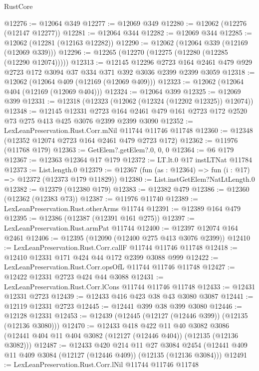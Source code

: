 \begin{lexlean}{RustCore}
\begin{coremodule}
@12276 := @12064 @349
@12277 := @12069 @349
@12280 := @12062 (@12276 (@12147 @12277))
@12281 := @12064 @344
@12282 := @12069 @344
@12285 := @12062 (@12281 (@12163 @12282))
@12290 := @12062 (@12064 @339 (@12169 (@12069 @339)))
@12296 := @12265 (@12270 (@12275 (@12280 (@12285 (@12290 @12074)))))
@12313 := @12145
    @12296
    @2723
    @164
    @2461
    @479
    @929
    @2723
    @172
    @3094
    @37
    @334
    @371
    @392
    @3036
    @2399
    @2399
    @3059
@12318 := @12062 (@12064 @409 (@12169 (@12069 @409)))
@12323 := @12062 (@12064 @404 (@12169 (@12069 @404)))
@12324 := @12064 @399
@12325 := @12069 @399
@12331 := @12318 (@12323 (@12062 (@12324 (@12202 @12325)) @12074))
@12348 := @12145
    @12331
    @2723
    @164
    @2461
    @479
    @161
    @2723
    @172
    @2520
    @73
    @275
    @413
    @425
    @3076
    @2399
    @2399
    @3090
@12352 := LexLeanPreservation.Rust.Corr.mNil @11744 @11746 @11748
@12360 := @12348 (@12352 @12074 @2723 @164 @2461 @479 @2723 @172)
@12362 := @11976 (@11768 @179)
@12363 := GetElem?.getElem?.{0, 0, 0}
@12364 := @6 @179
@12367 := @12363 @12364 @17 @179
@12372 := LT.lt.{0} @17 instLTNat @11784
@12373 := List.length.{0}
@12379 := @12367 (fun (as : @12364) => fun (i : @17) => @12372 (@12373 @179 @11829))
@12380 := List.instGetElem?NatLtLength.{0}
@12382 := @12379 (@12380 @179)
@12383 := @12382 @479
@12386 := @12360 (@12362 (@12383 @73))
@12387 := @11976 @11740
@12389 := LexLeanPreservation.Rust.otherArms @11744
@12391 := @12389 @164 @479
@12395 := @12386 (@12387 (@12391 @161 @275))
@12397 := LexLeanPreservation.Rust.armPat @11744
@12400 := @12397 @12074 @164 @2461
@12406 := @12395 (@12090 (@12400 @275 @413 @3076 @2399))
@12410 := LexLeanPreservation.Rust.Corr.callF @11744 @11746 @11748
@12418 := @12410 @12331 @171 @424 @44 @172 @2399 @3088 @999
@12422 := LexLeanPreservation.Rust.Corr.opsOfL @11744 @11746 @11748
@12427 := @12422 @12331 @2723 @424 @44 @3088
@12431 := LexLeanPreservation.Rust.Corr.lCons @11744 @11746 @11748
@12433 := @12431 @12331 @2723
@12439 := @12433 @416 @423 @38 @43 @3080 @3087
@12441 := @12119 @12331 @2723
@12445 := @12441 @399 @38 @399 @3080
@12446 := @12128 @12331
@12453 := @12439 (@12445 (@12127 (@12446 @399)) (@12135 (@12136 @3080)))
@12470 := @12433
    @418
    @422
    @11
    @40
    @3082
    @3086
    (@12441 @404 @11 @404 @3082 (@12127 (@12446 @404)) (@12135 (@12136 @3082)))
@12487 := @12433
    @420
    @214
    @11
    @27
    @3084
    @2454
    (@12441 @409 @11 @409 @3084 (@12127 (@12446 @409)) (@12135 (@12136 @3084)))
@12491 := LexLeanPreservation.Rust.Corr.lNil @11744 @11746 @11748

\end{coremodule}
\end{lexlean}
